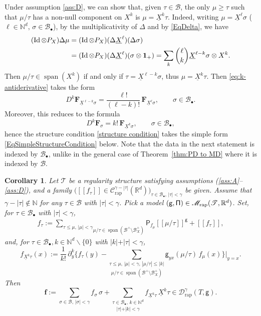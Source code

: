 \documentclass[JEP,XML,SOM,Unicode,published]{cedram}
\newcommand{\sbullet}{{\scriptscriptstyle\bullet}}
\DeclareMathOperator{\Span}{span}
\theoremstyle{plain}
\newtheorem{cor}[thm]{Corollary}
\theoremstyle{definition}
\DeclareMathOperator{\iden}{Id}
\newcommand{\Brac}[1]{[\![#1]\!]}
\newcommand{\bsf}{\boldsymbol{f}}
\newcommand{\rap}{\mathrm{rap}}
\newcommand{\sfP}{\mathsf{P}}
\newcommand{\sfg}{\mathsf{g}}
\newcommand{\bsF}{\boldsymbol{F}}
\newcommand{\scrM}{\mathscr{M}}
\newcommand{\scrT}{\mathscr{T}}
\newcommand{\bbN}{\mathbb{N}}
\newcommand{\bbR}{\mathbb{R}}
\newcommand{\mcB}{\mathcal{B}}
\newcommand{\mcC}{\mathcal{C}}
\newcommand{\mcD}{\mathcal{D}}
\begin{document}
Under assumption \eqref{ass:D}, we can show that, given $\tau\in\mcB$, the only $\mu\geq \tau$ such that $\mu/\tau$ has a non-null component on $X^k$ is $\mu=\underline{X}^k\tau$. Indeed, writing $\mu=\underline{X}^\ell\sigma$ ($\ell\in\bbN^d,\,\sigma\in\mcB_\sbullet$), by the multiplicativity of $\Delta$ and by \eqref{EqDelta}, we have
\begin{align*}
(\iden \otimes P_X)\Delta\mu
&=(\iden \otimes P_X)(\Delta\underline{X}^\ell)(\Delta\sigma)\\
&=(\iden \otimes P_X)(\Delta\underline{X}^\ell)(\sigma\otimes{\bf1}_+)
=\sum_{k}\binom{\ell}{k}\underline{X}^{\ell-k}\sigma\otimes X^{k}.
\end{align*}
Then $\mu/\tau\in\Span (X^k)$ if and only if $\tau=\underline{X}^{\ell-k}\sigma$, thus $\mu=\underline{X}^k\tau$.
Then \eqref{eq:k-antiderivative} takes the form
\[
D^k\bsF_{\underline{X}^{\ell-k}\sigma}=\frac{\ell!}{(\ell-k)!}\,\bsF_{\underline{X}^\ell\sigma},\qquad\sigma\in\mcB_\sbullet.
\]
Moreover, this reduces to the formula
\[
D^k\bsF_\sigma = k! \,\bsF_{\underline{X}^k\sigma},\qquad\sigma\in\mcB_\sbullet,
\]
hence the structure condition \eqref{structure condition} takes the simple form \eqref{EqSimpleStructureCondition} below. Note that the data in the next statement is indexed by $\mcB_\sbullet$, unlike in the general case of Theorem~\ref{thm:PD to MD} where it is indexed by $\mcB$.

\begin{cor} \label{thm:PD to MD2}
Let $\scrT$ be a regularity structure satisfying assumptions \textup{(\ref{ass:A}--\ref{ass:D})}, and a family $\bigl(\Brac{f_\tau}\in \mcC_\rap^{\gamma-|\tau|}(\bbR^d)\bigr)_{\tau\in\mcB_\sbullet,\,\vert\tau\vert<\gamma}$ be given. Assume that $\gamma-|\tau|\notin\bbN$ for any $\tau\in\mcB$ with $|\tau|<\gamma$. Pick a model ${\sf (g,\Pi)}\in\scrM_\rap(\scrT,\bbR^d)$. Set, for $\tau\in\mcB_\sbullet$ with $\vert\tau\vert<\gamma$,
\begin{align*}
f_\tau := \underset{\mu/\tau\in\Span (\mcB^+\setminus\mcB^+_X)}{\sum_{\tau\leq\mu, \,|\mu|<\gamma}} \sfP_{f_\mu}\Brac{\mu/\tau}^\sfg + \Brac{f_\tau},
\end{align*}
and, for $\tau\in\mcB_\sbullet, k\in\bbN^d\backslash\{0\}$ with $\vert k\vert+\vert\tau\vert<\gamma$,
\begin{equation} \label{EqSimpleStructureCondition}
f_{\underline{X}^k\tau}(x) :=
\frac1{k!}\,
\partial_y^k\bigg\{f_\tau(y) -
\underset{\mu/\tau\in\Span (\mcB^+\setminus\mcB^+_X)}{\sum_{\tau\leq\mu, \,|\mu|<\gamma,\, |\mu/\tau|\le|k|}}
\sfg_{yx}(\mu/\tau)\,f_\mu(x)\bigg\}\Big|_{y=x}.
\end{equation}
Then
\[
\bsf := \sum_{\sigma\in\mcB,\, \vert\sigma\vert<\gamma}f_\sigma\,\sigma + \underset{\vert\tau\vert+\vert k\vert<\gamma}{\sum_{\tau\in\mcB_\sbullet,\, k\in\bbN^d}} f_{\underline{X}^k\tau}\,\underline{X}^k\tau\in\mcD_\rap^{\gamma}(T, \sfg).
\]
\end{cor}
\end{document}
